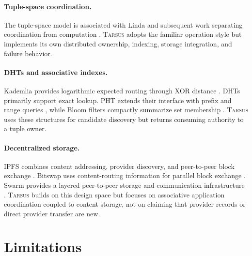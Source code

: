 \documentclass[conference]{IEEEtran}
\newcommand{\system}{\textsc{Tarsus}\xspace}
\begin{document}
\paragraph{Tuple-space coordination.}
The tuple-space model is associated with Linda and subsequent work separating
coordination from computation \cite{Gelernter1985,CarrieroGelernter1989}.
\system adopts the familiar operation style but implements its own distributed
ownership, indexing, storage integration, and failure behavior.

\paragraph{DHTs and associative indexes.}
Kademlia provides logarithmic expected routing through XOR distance
\cite{MaymounkovKademlia}. DHTs primarily support exact lookup. PHT extends
their interface with prefix and range queries \cite{RamabhadranPHT}, while
Bloom filters compactly summarize set membership \cite{Bloom1970}. \system uses
these structures for candidate discovery but returns consuming authority to a
tuple owner.

\paragraph{Decentralized storage.}
IPFS combines content addressing, provider discovery, and peer-to-peer block
exchange \cite{Trautwein2022}. Bitswap uses content-routing information for
parallel block exchange \cite{deLaRochaBitswap}. Swarm provides a layered
peer-to-peer storage and communication infrastructure \cite{SwarmWhitepaper}.
\system builds on this design space but focuses on associative application
coordination coupled to content storage, not on claiming that provider records
or direct provider transfer are new.

\section{Limitations}
\label{sec:limitations}
\end{document}
